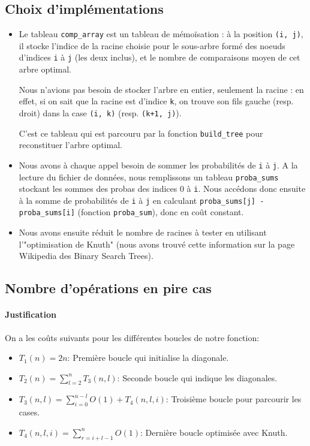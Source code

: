 \documentclass[a4paper, 10pt, french]{article}
\begin{document}
 \subsection{Choix d'implémentations}
 \begin{itemize}
	 \item Le tableau \verb?comp_array? est un tableau de mémoïsation : à la position \verb?(i, j)?, il stocke l'indice de la racine choisie pour le sous-arbre formé des noeuds d'indices \verb?i? à \verb?j? (les deux inclus), et le nombre de comparaisons moyen de cet arbre optimal.

		 Nous n'avions pas besoin de stocker l'arbre en entier, seulement la racine : en effet, si on sait que la racine est d'indice \verb?k?, on trouve son fils gauche (resp. droit) dans la case \verb?(i, k)? (resp. \verb?(k+1, j)?).

		 C'est ce tableau qui est parcouru par la fonction \verb?build_tree? pour reconstituer l'arbre optimal.

	 \item Nous avons à chaque appel besoin de sommer les probabilités de \verb?i? à \verb?j?. A la lecture du fichier de données, nous remplissons un tableau \verb?proba_sums? stockant les sommes des probas des indices 0 à \verb?i?.
		 Nous accédons donc ensuite à la somme de probabilités de \verb?i? à \verb?j? en calculant \verb?proba_sums[j] - proba_sums[i]? (fonction \verb?proba_sum?), donc en coût constant.

	 \item Nous avons ensuite réduit le nombre de racines à tester en utilisant l'"optimisation de Knuth" (nous avons trouvé cette information sur la page Wikipedia des Binary Search Trees).
 \end{itemize}

  \subsection{Nombre  d'opérations en pire cas}
	\paragraph{Justification}
	{ On a les coûts suivants pour les différentes boucles de notre fonction:}\\
	\begin{itemize}
		\item $T_{1}(n) = 2n$: Première boucle qui initialise la diagonale.\\
		\item $T_{2}(n) = \sum\limits_{l=2}^{n}{T_{3}(n,l)}$: Seconde boucle qui indique les diagonales.\\
		\item $T_{3}(n,l) = \sum\limits_{i=0}^{n-l}{O(1) + T_{4}(n,l,i)}$: Troisième boucle pour parcourir les cases.\\
		\item $T_{4}(n,l,i) = \sum\limits_{r=i+l-1}^{n}{O(1)}$: Dernière boucle optimisée avec Knuth.\\
	\end{itemize}
\end{document}
